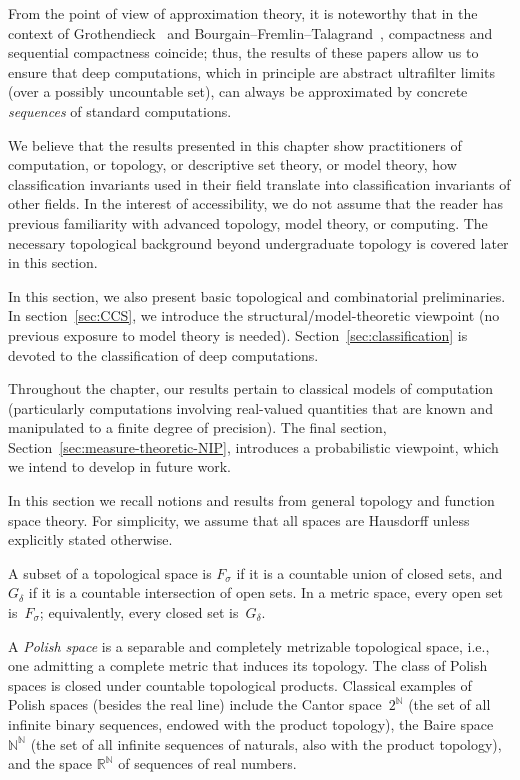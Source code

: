 From the point of view of approximation theory, it is noteworthy that in the context of Gro\-then\-dieck~\cite{Grothendieck:1952} and Bourgain--Fremlin--Talagrand~\cite{BFT_1978_PCompactBaire}, compactness and sequential compactness coincide; thus, the results of these papers allow us to ensure that deep computations, which in principle are abstract ultrafilter limits (over a possibly uncountable set), can always be approximated by concrete \emph{sequences} of standard computations.

We believe that the results presented in this chapter show practitioners of computation, or topology, or descriptive set theory, or model theory, how classification invariants used in their field translate into classification invariants of other fields.
In the interest of accessibility, we do not assume that the reader has previous familiarity with advanced topology, model theory, or computing.
The necessary topological background beyond undergraduate topology is covered later in this section.

In this section, we also present basic topological and combinatorial preliminaries. In section~\ref{sec:CCS}, we introduce the structural/model-theoretic viewpoint (no previous exposure to model theory is needed).
Section~\ref{sec:classification} is devoted to the classification of deep computations.

Throughout the chapter, our results pertain to classical models of computation (particularly computations involving real-valued quantities that are known and manipulated to a finite degree of precision).
The final section, Section~\ref{sec:measure-theoretic-NIP}, introduces a probabilistic viewpoint, which we intend to develop in future work.

In this section we recall notions and results from general topology and function space theory.
For simplicity, we assume that all spaces are Hausdorff unless explicitly stated otherwise.

A subset of a topological space is $F_\sigma$ if it is a countable union of closed sets, and $G_\delta$ if it is a countable intersection of open sets.
In a metric space, every open set is~$F_\sigma$; equivalently, every closed set is~$G_\delta$.

A \emph{Polish space} is a separable and completely metrizable topological space, i.e., one admitting a complete metric that induces its topology.
The class of Polish spaces is closed under countable topological products.
Classical examples of Polish spaces (besides the real line) include the Cantor space~$2^\mathbb{N}$ (the set of all infinite binary sequences, endowed with the product topology), the Baire space $\mathbb{N}^\mathbb{N}$ (the set of all infinite sequences of naturals, also with the product topology), and the space $\mathbb{R}^\mathbb{N}$ of sequences of real numbers.


